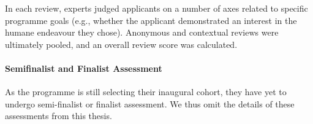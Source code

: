 In each review, experts judged applicants on a number of axes related to specific programme goals (e.g., whether the applicant demonstrated an interest in the humane endeavour they chose). Anonymous and contextual reviews were ultimately pooled, and an overall review score was calculated.

\paragraph{Semifinalist and Finalist Assessment}
As the programme is still selecting their inaugural cohort, they have yet to undergo semi-finalist or finalist assessment. We thus omit the details of these assessments from this thesis.